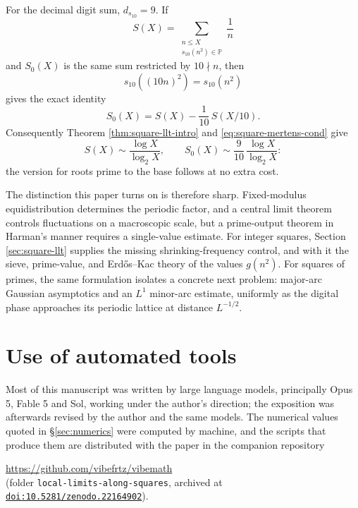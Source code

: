 \documentclass[11pt,reqno]{amsart}
\theoremstyle{plain}
\theoremstyle{definition}
\newcommand{\Pp}{\mathbb{P}}
\newcommand{\1}{\mathbf 1}
\begin{document}
For the decimal digit sum, $d_{s_{10}}=9$.  If
\[
 S(X)=\sum_{\substack{n\le X\\s_{10}(n^2)\in\Pp}}\frac1n
\]
and $S_0(X)$ is the same sum restricted by $10\nmid n$, then
\[
 s_{10}((10n)^2)=s_{10}(n^2)
\]
gives the exact identity
\[
 S_0(X)=S(X)-\frac1{10}\,S(X/10).
\]
Consequently Theorem \ref{thm:square-llt-intro} and \eqref{eq:square-mertens-cond} give
\[
 S(X)\sim\frac{\log X}{\log_2X},\qquad
 S_0(X)\sim\frac9{10}\,\frac{\log X}{\log_2X}:
\]
the version for roots prime to the base follows at no extra cost.

\medskip
The distinction this paper turns on is therefore sharp.  Fixed-modulus equidistribution determines the periodic factor, and a central limit theorem controls fluctuations on a macroscopic scale, but a prime-output theorem in Harman's manner requires a single-value estimate.  For integer squares, Section \ref{sec:square-llt} supplies the missing shrinking-frequency control, and with it the sieve, prime-value, and Erd\H{o}s--Kac theory of the values $g(n^2)$.  For squares of primes, the same formulation isolates a concrete next problem: major-arc Gaussian asymptotics and an $L^1$ minor-arc estimate, uniformly as the digital phase approaches its periodic lattice at distance $L^{-1/2}$.

\section*{Use of automated tools}

Most of this manuscript was written by large language models, principally Opus 5,
Fable 5 and Sol, working under the author's direction; the exposition was afterwards
revised by the author and the same models. The numerical values quoted in
\S\ref{sec:numerics} were computed by machine, and the scripts that produce them
are distributed with the paper in the companion repository
\begin{center}
  \url{https://github.com/vibefrtz/vibemath}\\[2pt]
  (folder \texttt{local-limits-along-squares}, archived at
  \href{https://doi.org/10.5281/zenodo.22164902}{\texttt{doi:10.5281/zenodo.22164902}}).
\end{center}
\end{document}
